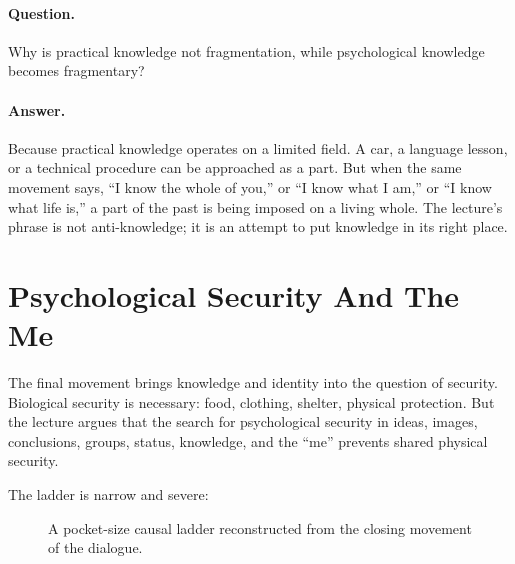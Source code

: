 \paragraph{Question.}
Why is practical knowledge not fragmentation, while psychological knowledge becomes fragmentary?

\paragraph{Answer.}
Because practical knowledge operates on a limited field. A car, a language lesson, or a technical procedure can be approached as a part. But when the same movement says, ``I know the whole of you,'' or ``I know what I am,'' or ``I know what life is,'' a part of the past is being imposed on a living whole. The lecture's phrase is not anti-knowledge; it is an attempt to put knowledge in its right place.

\section{Psychological Security And The Me}

The final movement brings knowledge and identity into the question of security. Biological security is necessary: food, clothing, shelter, physical protection. But the lecture argues that the search for psychological security in ideas, images, conclusions, groups, status, knowledge, and the ``me'' prevents shared physical security.

The ladder is narrow and severe:

\begin{figure}
\centering
{}
\caption{A pocket-size causal ladder reconstructed from the closing movement of the dialogue.}
\end{figure}

